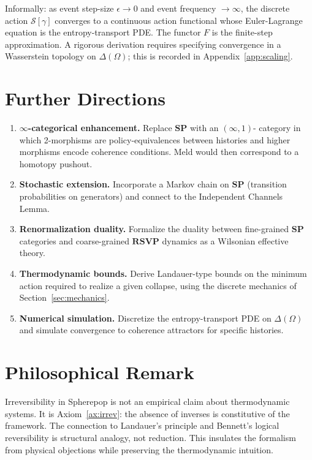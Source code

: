 \documentclass[12pt,a4paper]{article}
\theoremstyle{definition}
\theoremstyle{remark}
\newcommand{\SP}{\mathbf{SP}}
\newcommand{\RSVP}{\mathbf{RSVP}}
\begin{document}
Informally: as event step-size $\epsilon\to 0$ and event frequency $\to\infty$,
the discrete action $\mathcal{S}[\gamma]$ converges to a continuous action functional
whose Euler-Lagrange equation is the entropy-transport PDE. The functor $F$ is the
finite-step approximation. A rigorous derivation requires specifying convergence in a
Wasserstein topology on $\Delta(\Omega)$; this is recorded in
Appendix~\ref{app:scaling}.

\section{Further Directions}
\label{sec:further}

\begin{enumerate}
\item \textbf{$\infty$-categorical enhancement.} Replace $\SP$ with an $(\infty,1)$-
  category in which 2-morphisms are policy-equivalences between histories and higher
  morphisms encode coherence conditions. Meld would then correspond to a homotopy pushout.
\item \textbf{Stochastic extension.} Incorporate a Markov chain on $\SP$ (transition
  probabilities on generators) and connect to the Independent Channels Lemma.
\item \textbf{Renormalization duality.} Formalize the duality between fine-grained
  $\SP$ categories and coarse-grained $\RSVP$ dynamics as a Wilsonian effective theory.
\item \textbf{Thermodynamic bounds.} Derive Landauer-type bounds on the minimum action
  required to realize a given collapse, using the discrete mechanics of
  Section~\ref{sec:mechanics}.
\item \textbf{Numerical simulation.} Discretize the entropy-transport PDE on $\Delta(\Omega)$
  and simulate convergence to coherence attractors for specific histories.
\end{enumerate}

\section{Philosophical Remark}
\label{sec:philosophy}

Irreversibility in Spherepop is not an empirical claim about thermodynamic systems. It
is Axiom~\ref{ax:irrev}: the absence of inverses is constitutive of the framework. The
connection to Landauer's principle and Bennett's logical reversibility is structural
analogy, not reduction. This insulates the formalism from physical objections while
preserving the thermodynamic intuition.
\end{document}
